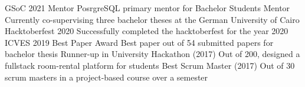 %
%
%


\begin{coursework}
    \courseworkentry
        {GSoC 2021 Mentor}
        {PosrgreSQL primary mentor for }
    \courseworkentry
        {Bachelor Students Mentor}
        {Currently co-supervising three bachelor theses at the German University of Cairo}
    \courseworkentry
        {Hacktoberfest 2020}
        {Successfully completed the hacktoberfest for the year 2020}
    \courseworkentry
        {ICVES 2019 Best Paper Award}
        {Best paper out of 54 submitted papers for bachelor thesis}
    \courseworkentry
        {Runner-up in University Hackathon (2017)}
        {Out of 200, designed a fullstack room-rental platform for students}
    \courseworkentry
        {Best Scrum Master (2017)}
        {Out of 30 scrum masters in a project-based course over a semester}
\end{coursework}
